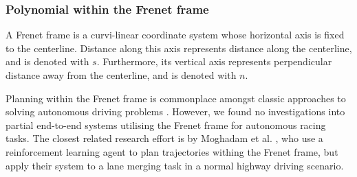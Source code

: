 

%     


\subsubsection{Polynomial within the Frenet frame}\label{sec:polynomial_path}
A Frenet frame is a curvi-linear coordinate system whose horizontal axis is fixed to the centerline. Distance along this axis represents distance along the centerline, and is denoted with $s$. 
Furthermore, its vertical axis represents perpendicular distance away from the centerline, and is denoted with $n$.

Planning within the Frenet frame is commonplace amongst classic approaches to solving autonomous driving problems \cite{Garlick2021, Vazquez2020, Werling2010}.
However, we found no investigations into partial end-to-end systems utilising the Frenet frame for autonomous racing tasks.
The closest related research effort is by Moghadam et al. \cite{Moghadam2020}, who use a reinforcement learning agent to plan trajectories withing the Frenet frame, but apply their system  to a lane merging task in a normal highway driving scenario.

